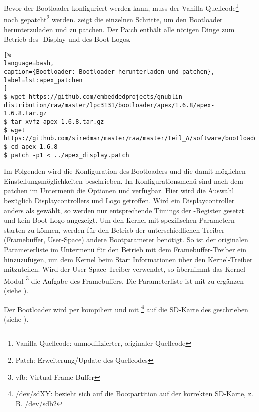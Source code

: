Bevor der Bootloader konfiguriert werden kann, muss der Vanilla-Quellcode\footnote{Vanilla-Quellcode: unmodifizierter, originaler Quellcode} noch gepatcht\footnote{Patch: Erweiterung/Update des Quellcodes} werden.  zeigt die einzelnen Schritte, um den Bootloader herunterzuladen und zu patchen. Der Patch enthält alle nötigen Dinge zum Betrieb des -Display und des Boot-Logos.

\begin{lstlisting}[%
language=bash,
caption={Bootloader: Bootloader herunterladen und patchen},
label=lst:apex_patchen
]
$ wget https://github.com/embeddedprojects/gnublin-distribution/raw/master/lpc3131/bootloader/apex/1.6.8/apex-1.6.8.tar.gz
$ tar xvfz apex-1.6.8.tar.gz
$ wget https://github.com/siredmar/master/raw/master/Teil_A/software/bootloader/apex_display.patch
$ cd apex-1.6.8
$ patch -p1 < ../apex_display.patch
\end{lstlisting}

Im Folgenden wird die Konfiguration des Bootloaders und die damit möglichen Einstellungsmöglichkeiten beschrieben. Im Konfigurationsmenü sind nach dem patchen im Untermenü  die Optionen  und  verfügbar. Hier wird die Auswahl bezüglich Displaycontrollers und Logo getroffen. Wird ein Displaycontroller anders als  gewählt, so werden nur entsprechende Timings der -Register gesetzt und kein Boot-Logo angezeigt. 
Um den Kernel mit spezifischen Parametern starten zu können, werden für den Betrieb der unterschiedlichen Treiber (Framebuffer, User-Space) andere Bootparameter benötigt. So ist der originalen Parameterliste  im Untermenü  für den Betrieb mit dem Framebuffer-Treiber ein  hinzuzufügen, um dem Kernel beim Start Informationen über den Kernel-Treiber  mitzuteilen. Wird der User-Space-Treiber verwendet, so übernimmt das Kernel-Modul \footnote{vfb: Virtual Frame Buffer} die Aufgabe des Framebuffers. Die Parameterliste ist mit  zu ergänzen (siehe \cite{LinuxKernelFBCON}).

Der Bootloader wird per  kompiliert und mit  \footnote{/dev/sdXY: bezieht sich auf die Bootpartition auf der korrekten SD-Karte, z. B. /dev/sdb2} auf die SD-Karte des  geschrieben (siehe \cite{GnublinWiki2013a}).

